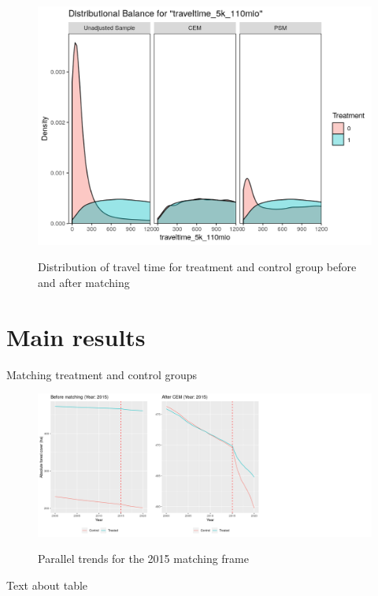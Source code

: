 \documentclass{article}
\begin{document}
\begin{figure}[H]
\centering
\caption{Distribution of travel time for treatment and control group before and after matching}
\includegraphics[width=0.9\linewidth]{"figures/matching frame 2015-2"}
\label{fig:travel2015}
\end{figure}




\section{Main results}

Matching treatment and control groups 

\begin{figure}[H]
\centering
\caption{Parallel trends for the 2015 matching frame}
\includegraphics[width=1.5\linewidth]{"figures/create plots before after matching-1"}
\label{fig:parallel2015}
\end{figure}


Text about table
\end{document}
